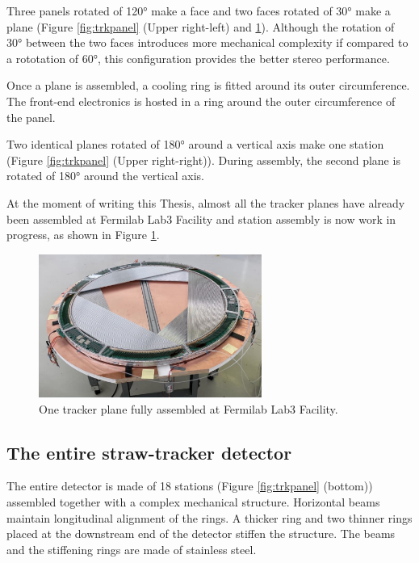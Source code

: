 Three panels rotated of 120° make a face and two faces rotated of 
30° make a plane (Figure \ref{fig:trkpanel} (Upper right-left) and \ref{fig:trueplane}).
Although the rotation of 30° between the two faces introduces more mechanical complexity if 
compared to a rototation of 60°, this configuration provides the better stereo performance.

Once a plane is assembled, a cooling ring is fitted around its outer circumference. 
The front-end electronics is hosted in a ring around the outer 
circumference of the panel.

Two identical planes rotated of 180° around a vertical axis make one station 
(Figure \ref{fig:trkpanel} (Upper right-right)). 
During assembly, the second plane is rotated of 180° around the vertical axis.

At the moment of writing this Thesis, almost all the tracker planes have 
already been assembled at Fermilab Lab3 Facility and station assembly is now work in progress, 
as shown in Figure \ref{fig:trueplane}.

\begin{figure}[!h]
    \centering
    \includegraphics[width =0.65\textwidth]{figures/png/Screenshot_20240706_163056.png}
    \caption{One tracker plane fully assembled at Fermilab Lab3 Facility.}
    \label{fig:trueplane}
\end{figure}
\subsection{The entire straw-tracker detector}

The entire detector is made of 18 stations (Figure \ref{fig:trkpanel} 
(bottom)) assembled together with a complex mechanical structure. 
Horizontal beams maintain longitudinal alignment of the rings. 
A thicker ring and two thinner rings placed at the downstream end 
of the detector stiffen the structure. The beams and the stiffening rings 
are made of stainless steel.


